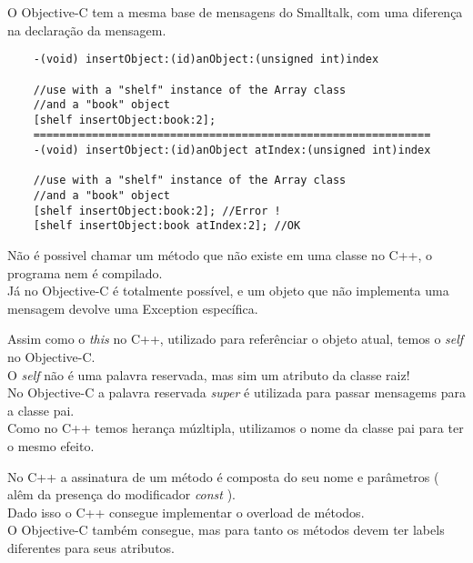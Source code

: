 \documentclass[brazil]{beamer}
\begin{document}
\begin{frame}[fragile]
  O Objective-C tem a mesma base de mensagens do Smalltalk, com uma diferença na declaração da mensagem. \\
  \lstset{language=C++,basicstyle=\scriptsize}
  \begin{lstlisting}
    -(void) insertObject:(id)anObject:(unsigned int)index
    
    //use with a "shelf" instance of the Array class 
    //and a "book" object
    [shelf insertObject:book:2];
    =============================================================
    -(void) insertObject:(id)anObject atIndex:(unsigned int)index
    
    //use with a "shelf" instance of the Array class 
    //and a "book" object
    [shelf insertObject:book:2]; //Error !
    [shelf insertObject:book atIndex:2]; //OK
  \end{lstlisting}
\end{frame}

\begin{frame}
  Não é possivel chamar um método que não existe em uma classe no C++, o programa nem é compilado. \\
  Já no Objective-C é totalmente possível, e um objeto que não implementa uma mensagem devolve uma Exception específica.
\end{frame}

\begin{frame}
  Assim como o \textit{this} no C++, utilizado para referênciar o objeto atual, temos o \textit{self} no Objective-C. \\
  O \textit{self} não é uma palavra reservada, mas sim um atributo da classe raiz! \\
  No Objective-C a palavra reservada \textit{super} é utilizada para passar mensagems para a classe pai. \\
  Como no C++ temos herança múzltipla, utilizamos o nome da classe pai para ter o mesmo efeito.
\end{frame}

\begin{frame}
  No C++ a assinatura de um método é composta do seu nome e parâmetros ( alêm da presença do modificador \textit{const} ). \\
  Dado isso o C++ consegue implementar o overload de métodos. \\
  O Objective-C também consegue, mas para tanto os métodos devem ter labels diferentes para seus atributos.
\end{frame}
\end{document}
